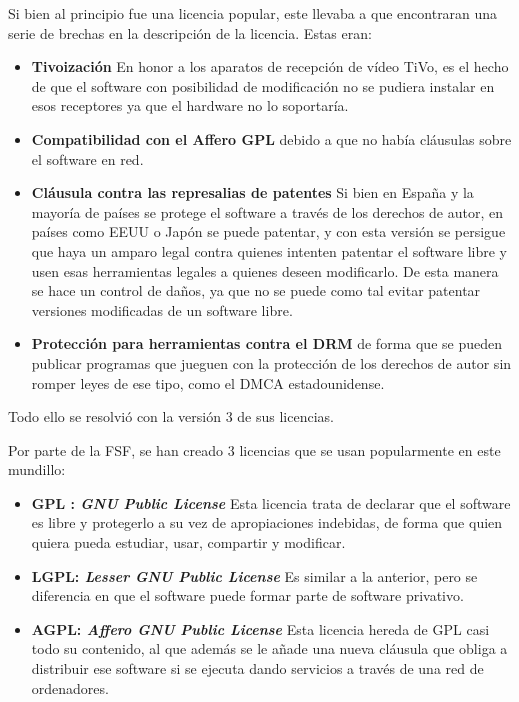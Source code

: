 Si bien al principio fue una licencia popular, este llevaba a que encontraran una serie de brechas en la descripción de la licencia. Estas eran:
\begin{itemize}
	\item \textbf{Tivoización} En honor a los aparatos de recepción de vídeo TiVo, es el hecho de que el software con posibilidad de modificación no se pudiera instalar en esos receptores ya que el hardware no lo soportaría.
	
	\item \textbf{Compatibilidad con el Affero GPL} debido a que no había cláusulas sobre el software en red.
	
	\item \textbf{Cláusula contra las represalias de patentes} Si bien en España y la mayoría de países se protege el software a través de los derechos de autor, en países como EEUU o Japón se puede patentar, y con esta versión se persigue que haya un amparo legal contra quienes intenten patentar el software libre y usen esas herramientas legales a quienes deseen modificarlo. De esta manera se hace un control de daños, ya que no se puede como tal evitar patentar versiones modificadas de un software libre.
	
	\item \textbf{Protección para herramientas contra el DRM} de forma que se pueden publicar programas que jueguen con la protección de los derechos de autor sin romper leyes de ese tipo, como el DMCA estadounidense.
	
\end{itemize} 

Todo ello se resolvió con la versión 3 de sus licencias. \cite{gplv3-changelog}

Por parte de la FSF, se han creado 3 licencias que se usan popularmente en este mundillo:

\begin{itemize}
	\item \textbf{GPL : \textit{GNU Public License}} Esta licencia trata de declarar que el software es libre y protegerlo a su vez de apropiaciones indebidas, de forma que quien quiera pueda estudiar, usar, compartir y modificar. 
	\item \textbf{LGPL: \textit{Lesser GNU Public License}} Es similar a la anterior, pero se diferencia en que el software puede formar parte de software privativo.
	\item \textbf{AGPL: \textit{Affero GNU Public License}} Esta licencia hereda de GPL casi todo su contenido, al que además se le añade una nueva cláusula que obliga a distribuir ese software si se ejecuta dando servicios a través de una red de ordenadores.
\end{itemize}

